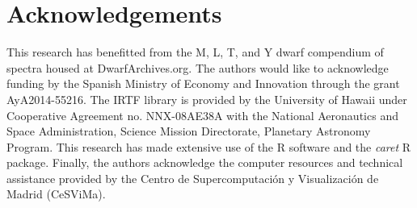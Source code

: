 \documentclass[a4paper,fleqn,usenatbib]{mnras}
\begin{document}
\section*{Acknowledgements}
This research has benefitted from the M, L, T, and Y dwarf compendium
of spectra housed at DwarfArchives.org.  The authors would like to
acknowledge funding by the Spanish Ministry of Economy and Innovation
through the grant AyA2014-55216. The IRTF library is provided by the
University of Hawaii under Cooperative Agreement no. NNX-08AE38A with
the National Aeronautics and Space Administration, Science Mission
Directorate, Planetary Astronomy Program. This research has made
extensive use of the R software \cite{R} and the {\it caret} R
package. Finally, 
the authors acknowledge the computer resources and technical assistance 
provided by the Centro de Supercomputaci\'on y Visualizaci\'on de Madrid (CeSViMa).



\begin{appendix}
\label{app}



\end{appendix}


{}

\end{document}
